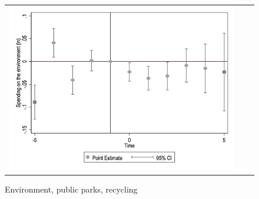 \begin{figure}[!ht]
\begin{tabular}{@{}ccc@{}}
\begin{minipage}[t]{0.32\textwidth}
            \centering
            \caption{Environment, public parks, recycling}
            \includegraphics[width=\linewidth]{images/pop_100000/caseventdd_ln_q4_09_step1.jpg}
            \label{fig:casenvironment}
        \end{minipage}
    \end{tabular}
\end{figure}
